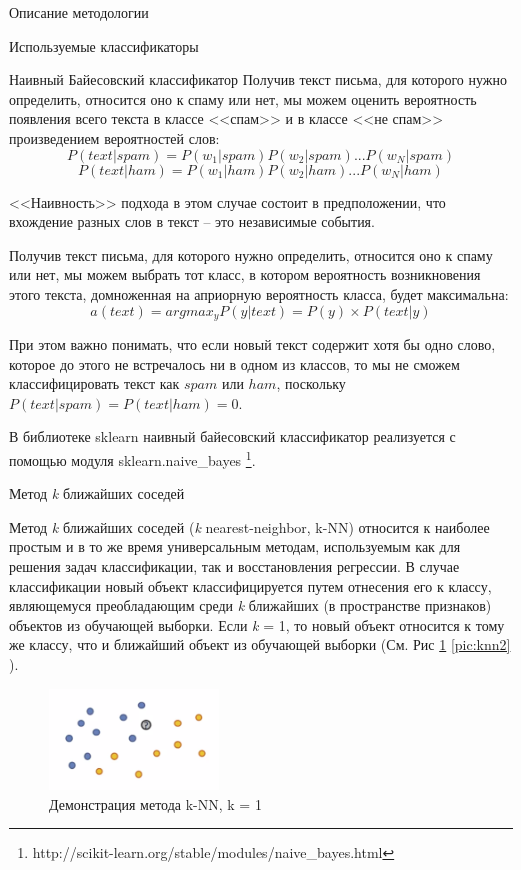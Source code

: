 \begin{section}{Описание методологии}
\begin{subsection}{Используемые классификаторы}
\begin{subsubsection}{Наивный Байесовский классификатор}
Получив текст письма, для которого нужно определить, относится оно к спаму или нет, мы можем оценить вероятность появления всего текста в классе <<спам>> и в классе <<не спам>> произведением вероятностей слов:
\begin{equation}
P(text|spam) = P(w_1|spam)P(w_2|spam)...P(w_N|spam)
\end{equation}
\begin{equation}
P(text|ham) = P(w_1|ham)P(w_2|ham)...P(w_N|ham)
\end{equation}

<<Наивность>> подхода в этом случае состоит в предположении, что вхождение разных слов в текст – это независимые события.

Получив текст письма, для которого нужно определить, относится оно к спаму или нет, мы можем выбрать тот класс, в котором вероятность возникновения этого текста, домноженная на априорную вероятность класса, будет максимальна:
\begin{equation}
a(text) = arg⁡max_{y}⁡ P(y|text) = P(y) \times P(text|y)
\end{equation}

При этом важно понимать, что если новый текст содержит хотя бы одно слово, которое до этого не встречалось ни в одном из классов, то мы не сможем классифицировать текст как $spam$ или $ham$, поскольку $P(text|spam) = P(text|ham) = 0$.


В библиотеке sklearn наивный байесовский классификатор реализуется с помощью модуля sklearn.naive\_bayes \footnote{http://scikit-learn.org/stable/modules/naive\_bayes.html}.


\end{subsubsection}

    \begin{subsubsection}{Метод \textit{k} ближайших соседей}

      Метод \textit{k} ближайших соседей (\textit{k} nearest-neighbor, k-NN) относится к наиболее простым и в то же время универсальным методам, используемым как для решения задач классификации, так и восстановления регрессии. В случае классификации новый объект классифицируется путем отнесения его к классу, являющемуся преобладающим среди \textit{k} ближайших (в пространстве признаков) объектов из обучающей выборки. Если \textit{k} = 1, то новый объект относится к тому же классу, что и ближайший объект из обучающей выборки (См. Рис \ref{pic:knn1} \ref{pic:knn2} ).

\begin{figure}[ht!]
\centering
\includegraphics[width=0.4\textwidth]{pics/knn1}
\caption{Демонстрация метода k-NN, k = 1}
\label{pic:knn1}
\end{figure}



\end{subsubsection}
\end{subsection}
\end{section}
